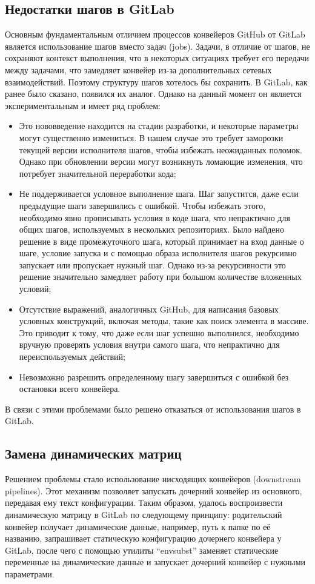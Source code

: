 \subsection{Недостатки шагов в GitLab} \label{subsec:gitlab-steps-problems}
Основным фундаментальным отличием процессов конвейеров GitHub от GitLab является использование шагов вместо задач (jobs).
Задачи, в отличие от шагов, не сохраняют контекст выполнения, что в некоторых ситуациях требует его передачи между задачами,
что замедляет конвейер из-за дополнительных сетевых взаимодействий.
Поэтому структуру шагов хотелось бы сохранить.
В GitLab, как ранее было сказано, появился их аналог.
Однако на данный момент он является экспериментальным и имеет ряд проблем:
\begin{itemize}
  \item Это нововведение находится на стадии разработки, и некоторые параметры могут существенно измениться.
        В нашем случае это требует заморозки текущей версии исполнителя шагов, чтобы избежать неожиданных поломок.
        Однако при обновлении версии могут возникнуть ломающие изменения, что потребует значительной переработки кода;
  \item Не поддерживается условное выполнение шага.
        Шаг запустится, даже если предыдущие шаги завершились с ошибкой.
        Чтобы избежать этого, необходимо явно прописывать условия в коде шага, что непрактично для общих шагов, используемых в нескольких репозиториях.
        Было найдено решение в виде промежуточного шага, который принимает на вход данные о шаге, условие запуска и с помощью образа исполнителя шагов рекурсивно запускает или пропускает нужный шаг.
        Однако из-за рекурсивности это решение значительно замедляет работу при большом количестве вложенных условий;
  \item Отсутствие выражений, аналогичных GitHub, для написания базовых условных конструкций, включая методы, такие как поиск элемента в массиве.
        Это приводит к тому, что даже если шаг успешно выполнился, необходимо вручную проверять условия внутри самого шага, что непрактично для переиспользуемых действий;
  \item Невозможно разрешить определенному шагу завершиться с ошибкой без остановки всего конвейера.
\end{itemize}

В связи с этими проблемами было решено отказаться от использования шагов в GitLab.

\subsection{Замена динамических матриц} \label{subsec:dymamic-matricies}
Решением проблемы стало использование нисходящих конвейеров (downstream pipelines).
Этот механизм позволяет запускать дочерний конвейер из основного, передавая ему текст конфигурации.
Таким образом, удалось воспроизвести динамическую матрицу в GitLab по следующему принципу:
родительский конвейер получает динамические данные, например, путь к папке по её названию,
запрашивает статическую конфигурацию дочернего конвейера у GitLab,
после чего с помощью утилиты \enquote{envsubst} заменяет статические переменные на динамические данные и запускает дочерний конвейер с нужными параметрами.

